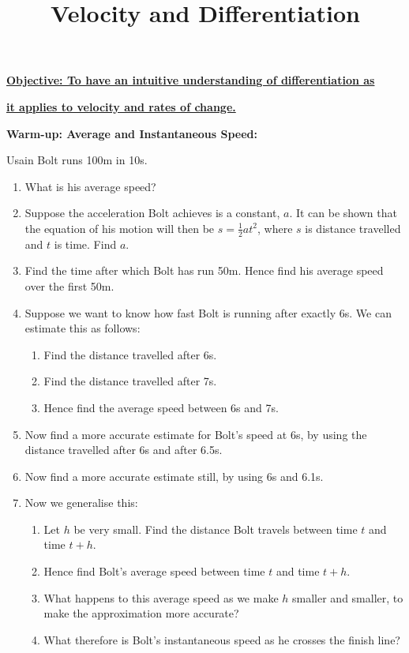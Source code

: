 \documentclass{article}
\begin{document}
\title{Velocity and Differentiation}
\date{}

\maketitle
\thispagestyle{empty}

\Large

\textbf{\underline{Objective: To have an intuitive understanding of differentiation as}}

\textbf{\underline{it applies to velocity and rates of change.}}



\vspace{5mm}


{\bf Warm-up: Average and Instantaneous Speed:}

\vspace{5mm}

Usain Bolt runs 100m in 10s. 
\begin{enumerate}
	\item What is his average speed?
	\item Suppose the acceleration Bolt achieves is a constant, $a$. It can be shown that the equation of his motion will then be $s=\frac{1}{2}at^2$, where $s$ is distance travelled and $t$ is time. Find $a$.
	\item Find the time after which Bolt has run 50m. Hence find his average speed over the first 50m.
	\item Suppose we want to know how fast Bolt is running after exactly 6s. We can estimate this as follows:
		\begin{enumerate}
			\item Find the distance travelled after 6s.
			\item Find the distance travelled after 7s.
			\item Hence find the average speed between 6s and 7s.
		\end{enumerate}
	\item Now find a more accurate estimate for Bolt's speed at 6s, by using the distance travelled after 6s and after 6.5s.
	\item Now find a more accurate estimate still, by using 6s and 6.1s.
	\item Now we generalise this:
		\begin{enumerate}
			\item Let $h$ be very small. Find the distance Bolt travels between time $t$ and time $t+h$.
			\item Hence find Bolt's average speed between time $t$ and time $t+h$.
			\item What happens to this average speed as we make $h$ smaller and smaller, to make the approximation more accurate?
			\item What therefore is Bolt's instantaneous speed as he crosses the finish line?
		\end{enumerate}
\end{enumerate}
\end{document}
